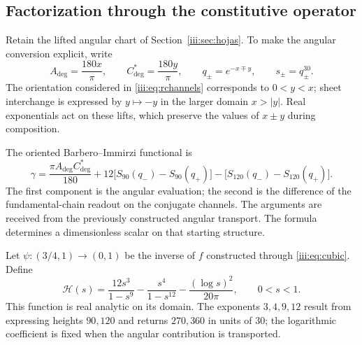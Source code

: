 \subsection{Factorization through the constitutive operator}

Retain the lifted angular chart of
Section~\ref{iii:sec:hojas}. To make the angular conversion explicit,
write
\begin{equation}
 A_{\deg}=\frac{180x}{\pi},\qquad
 C^*_{\deg}=\frac{180y}{\pi},\qquad
 q_\pm=e^{-x\mp y},\qquad s_\pm=q_\pm^{30}.
 \label{iii:eq:barbero-angular-lift}
\end{equation}
The orientation considered in \eqref{iii:eq:rchannels} corresponds to
$0<y<x$; sheet interchange is expressed by $y\mapsto-y$ in the
larger domain $x>|y|$. Real exponentials act on these
lifts, which preserve the values of $x\pm y$ during
composition.

The oriented Barbero--Immirzi functional is
\begin{equation}
 \gamma=\frac{\pi A_{\deg}C^*_{\deg}}{180}
   +12\bigl[S_{90}(q_-)-S_{90}(q_+)\bigr]
   -\bigl[S_{120}(q_-)-S_{120}(q_+)\bigr].
 \label{iii:eq:barbero-functional}
\end{equation}
The first component is the angular evaluation; the second is the
difference of the fundamental-chain readout on the conjugate channels.
The arguments are received from the previously constructed angular transport.
The formula determines a dimensionless scalar on that starting
structure.

Let $\psi:(3/4,1)\to(0,1)$ be the inverse of $f$ constructed through
\eqref{iii:eq:cubic}. Define
\begin{equation}
 \mathcal H(s)=\frac{12s^3}{1-s^9}
             -\frac{s^4}{1-s^{12}}
             -\frac{(\log s)^2}{20\pi},\qquad 0<s<1.
 \label{iii:eq:barbero-h}
\end{equation}
This function is real analytic on its domain. The exponents $3,4,9,12$
result from expressing heights $90,120$ and returns $270,360$ in
units of $30$; the logarithmic coefficient is fixed when
the angular contribution is transported.

